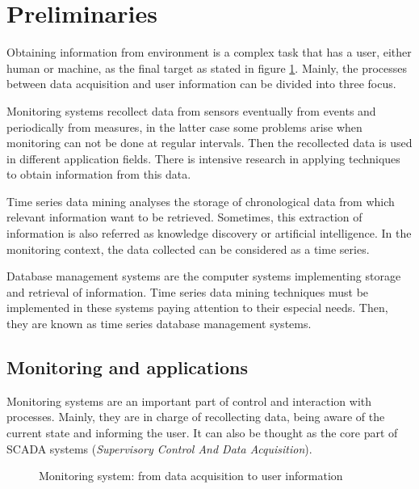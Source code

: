 
\section{Preliminaries}\label{sec:preliminaries}

Obtaining information from environment is a complex task that has a user, either human or machine, as the final target as stated in figure \ref{fig:monitoring_system}. Mainly, the processes between data acquisition and user information can be divided into three focus.


Monitoring systems recollect data from sensors eventually from events and periodically from measures, in the latter case some problems arise when monitoring can not be done at regular intervals. Then the recollected data is used in different application fields. There is intensive research in applying techniques to obtain information from this data.

Time series data mining analyses the storage of chronological data from which relevant information want to be retrieved. Sometimes, this extraction of information is also referred as knowledge discovery or artificial intelligence.
In the monitoring context, the data collected can be considered as a time series.

Database management systems are the computer systems implementing storage and retrieval of information. Time series data mining techniques must be implemented in these systems paying attention to their especial needs. Then, they are known as time series database management systems.



\subsection{Monitoring and applications}

Monitoring systems are an important part of control and interaction with processes. Mainly, they are in charge of recollecting data, being aware of the current state and informing the user.  It can also be thought as the core part of SCADA systems (\emph{Supervisory Control And Data Acquisition}). 

\begin{figure}[tp]
  \begin{center}
    \scriptsize 
    
  \end{center}
  \caption{Monitoring system: from data acquisition to user information}
  \label{fig:monitoring_system}
\end{figure}

